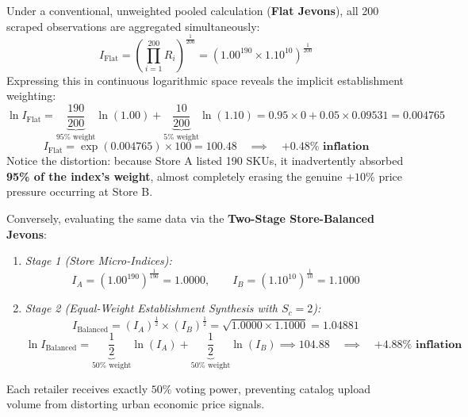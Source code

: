 \hs Under a conventional, unweighted pooled calculation (\textbf{Flat Jevons}), all 200 scraped observations are aggregated simultaneously:
\begin{equation}
    I_{\text{Flat}} = \left( \prod_{i=1}^{200} R_i \right)^{\frac{1}{200}} = \left( 1.00^{190} \times 1.10^{10} \right)^{\frac{1}{200}}
\end{equation}
Expressing this in continuous logarithmic space reveals the implicit establishment weighting:
\begin{equation}
    \ln I_{\text{Flat}} = \underbrace{\frac{190}{200}}_{95\% \text{ weight}} \ln(1.00) + \underbrace{\frac{10}{200}}_{5\% \text{ weight}} \ln(1.10) = 0.95 \times 0 + 0.05 \times 0.09531 = 0.004765
\end{equation}
\begin{equation}
    I_{\text{Flat}} = \exp(0.004765) \times 100 = \mathbf{100.48} \quad \implies \quad \mathbf{+0.48\% \text{ inflation}}
\end{equation}
Notice the distortion: because Store A listed 190 SKUs, it inadvertently absorbed \textbf{95\% of the index's weight}, almost completely erasing the genuine $+10\%$ price pressure occurring at Store B.

\hs Conversely, evaluating the same data via the \textbf{Two-Stage Store-Balanced Jevons}:
\begin{enumerate}
    \item \textit{Stage 1 (Store Micro-Indices):}
    \begin{equation}
        I_A = \left( 1.00^{190} \right)^{\frac{1}{190}} = 1.0000, \qquad I_B = \left( 1.10^{10} \right)^{\frac{1}{10}} = 1.1000
    \end{equation}
    \item \textit{Stage 2 (Equal-Weight Establishment Synthesis with $S_c = 2$):}
    \begin{equation}
        I_{\text{Balanced}} = \left( I_A \right)^{\frac{1}{2}} \times \left( I_B \right)^{\frac{1}{2}} = \sqrt{1.0000 \times 1.1000} = 1.04881
    \end{equation}
    \begin{equation}
        \ln I_{\text{Balanced}} = \underbrace{\frac{1}{2}}_{50\% \text{ weight}} \ln(I_A) + \underbrace{\frac{1}{2}}_{50\% \text{ weight}} \ln(I_B) \implies \mathbf{104.88} \quad \implies \quad \mathbf{+4.88\% \text{ inflation}}
    \end{equation}
\end{enumerate}
Each retailer receives exactly $50\%$ voting power, preventing catalog upload volume from distorting urban economic price signals.

